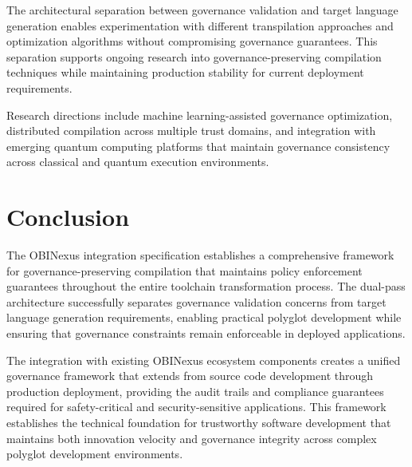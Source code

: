 The architectural separation between governance validation and target language generation enables experimentation with different transpilation approaches and optimization algorithms without compromising governance guarantees. This separation supports ongoing research into governance-preserving compilation techniques while maintaining production stability for current deployment requirements.

Research directions include machine learning-assisted governance optimization, distributed compilation across multiple trust domains, and integration with emerging quantum computing platforms that maintain governance consistency across classical and quantum execution environments.

\section*{Conclusion}

The OBINexus integration specification establishes a comprehensive framework for governance-preserving compilation that maintains policy enforcement guarantees throughout the entire toolchain transformation process. The dual-pass architecture successfully separates governance validation concerns from target language generation requirements, enabling practical polyglot development while ensuring that governance constraints remain enforceable in deployed applications.

The integration with existing OBINexus ecosystem components creates a unified governance framework that extends from source code development through production deployment, providing the audit trails and compliance guarantees required for safety-critical and security-sensitive applications. This framework establishes the technical foundation for trustworthy software development that maintains both innovation velocity and governance integrity across complex polyglot development environments.



